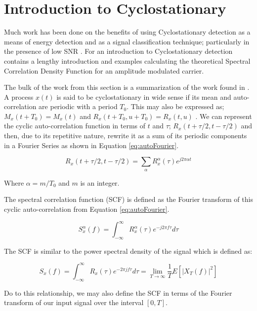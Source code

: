 \chapter{Introduction to Cyclostationary}

Much work has been done on the benefits of using Cyclostationary detection as a
means of energy detection and as a signal classification
technique; particularly in the presence of low SNR \cite{kim2007}.  For an
introduction to Cyclostationary detection \cite{costa1996} contains a lengthy introduction and
examples calculating the theoretical Spectral Correlation Density Function for
an amplitude modulated carrier.

The bulk of the work from this section is a summarization of the work found in
\cite{kim2007}.  A process $x(t)$ is said to be cyclostationary in wide sense
if its mean and auto-correlation are periodic with a period $T_0$.  This may also be expressed as; $M_x(t+T_0) = M_x(t)$ and $R_x(t+T_0, u + T_0) = R_x(t,u)$ \cite{kim2007}. 
We can represent the cyclic auto-correlation function in terms of $t$ and
$\tau$; $R_x(t+\tau/2, t-\tau/2)$ and then, due to its repetitive nature,
rewrite it as a sum of its periodic components in a Fourier Series as shown in
Equation \ref{eq:autoFourier}.

\begin{equation}
R_x(t+\tau/2, t- \tau/2) = \sum_{\alpha} R_x^{\alpha}(\tau)e^{j2\pi \alpha t}
\label{eq:autoFourier}
\end{equation}

Where $\alpha = m/T_0$ and $m$ is an integer. 

The spectral correlation function (SCF) is defined as the Fourier transform of
this cyclic auto-correlation from Equation \ref{eq:autoFourier}.

\begin{equation}
S_x^{\alpha}(f) = \int_{-\infty}^{\infty} R_x^{\alpha}(\tau)e^{-j2\pi f \tau} d\tau
\label{eq:ScdDefined}
\end{equation}

The SCF is similar to the power spectral density of the signal which is defined
as: 

\begin{equation}
S_x(f) = \int_{-\infty}^{\infty} R_x(\tau)e^{-2\pi j f \tau} d\tau = \lim_{T \to \infty} \frac{1}{T}E[|X_T(f)|^2]
\label{eq:PSDDef}
\end{equation}


Do to this relationship, we may also define the SCF in terms of the Fourier
transform of our input signal over the interval $[0, T]$.

